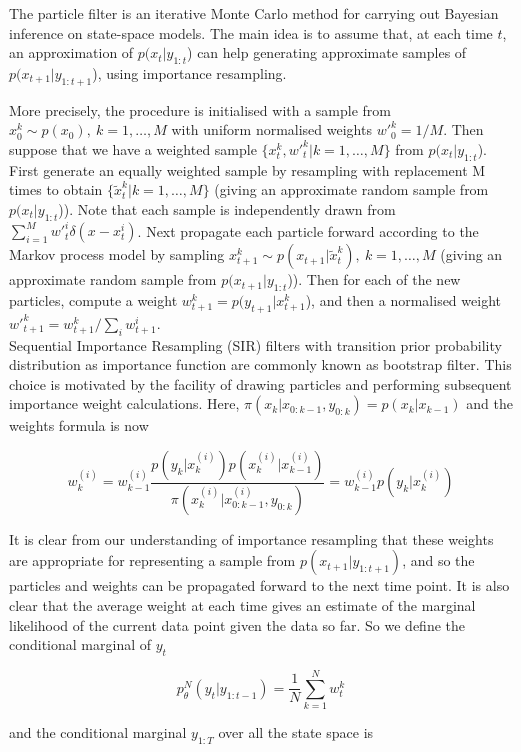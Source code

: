 \documentclass[11pt,a4,twosided,singlespacing,titlepagenumber=on]{scrreprt}
\numberwithin{equation}{chapter} %
\theoremstyle{remark}
\begin{document}
The particle filter is an iterative Monte Carlo method for carrying out Bayesian inference on state-space models. The main idea is to assume that, at each time $t$, an approximation of $p(x_t|y_{1:t}$) can help generating approximate samples of $p(x_{t+1}|y_{1:t+1}$), using importance resampling.

\noindent
More precisely, the procedure is initialised with a sample from $x_0^k \sim p(x_0),\ k=1,\ldots,M$ with uniform normalised weights ${w'}_0^k=1/M$. Then suppose that we have a weighted sample $\{x_t^k,{w'}_t^k|k=1,\ldots,M\}$ from $p(x_t|y_{1:t}$). First generate an equally weighted sample by resampling with replacement M times to obtain $\{\tilde{x}_t^k|k=1,\ldots,M\}$ (giving an approximate random sample from $p(x_t|y_{1:t}$)). Note that each sample is independently drawn from $\sum_{i=1}^M {w'}_t^i\delta(x-x_t^i)$. Next propagate each particle forward according to the Markov process model by sampling $x_{t+1}^k\sim p(x_{t+1}|\tilde{x}_t^k),\ k=1,\ldots,M$ (giving an approximate random sample from $p(x_{t+1}|y_{1:t}$)). Then for each of the new particles, compute a weight $w_{t+1}^k=p(y_{t+1}|x_{t+1}^k$), and then a normalised weight ${w'}_{t+1}^k=w_{t+1}^k/\sum_i w_{t+1}^i$. \\

\noindent
Sequential Importance Resampling (SIR) filters with transition prior probability distribution as importance function are commonly known as bootstrap filter. This choice is motivated by the facility of drawing particles and performing subsequent importance weight calculations. Here, $\pi(x_k| x_{0:k-1}, y_{0:k}) = p(x_k|x_{k-1})$ and the weights formula is now

$$
w_k^{(i)} = w_{k-1}^{(i)} \frac{p(y_k|x_k^{(i)})p(x_k^{(i)}|x^{(i)}_{k-1})}{\pi(x_k^{(i)}|x^{(i)}_{0:k-1},y_{0:k})}= w_{k-1}^{(i)} p(y_k|x_k^{(i)})
$$ 

\noindent
It is clear from our understanding of importance resampling that these weights are appropriate for representing a sample from $p(x_{t+1}|y_{1:t+1})$, and so the particles and weights can be propagated forward to the next time point. It is also clear that the average weight at each time gives an estimate of the marginal likelihood of the current data point given the data so far. So we define the conditional marginal of $y_t$

$$ p^N_{\theta}(y_t | y_{1:t-1}) = \frac{1}{N} \sum_{k=1}^N w_t^k$$

\noindent
and the conditional marginal $y_{1:T}$ over all the state space is
\end{document}
